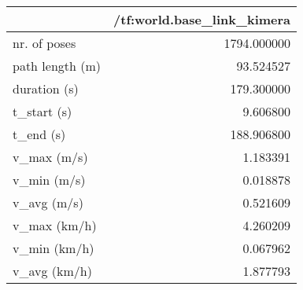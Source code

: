\begin{tabular}{lr}
\toprule
{} &  /tf:world.base\_link\_kimera \\
\midrule
nr. of poses    &                 1794.000000 \\
path length (m) &                   93.524527 \\
duration (s)    &                  179.300000 \\
t\_start (s)     &                    9.606800 \\
t\_end (s)       &                  188.906800 \\
v\_max (m/s)     &                    1.183391 \\
v\_min (m/s)     &                    0.018878 \\
v\_avg (m/s)     &                    0.521609 \\
v\_max (km/h)    &                    4.260209 \\
v\_min (km/h)    &                    0.067962 \\
v\_avg (km/h)    &                    1.877793 \\
\bottomrule
\end{tabular}
